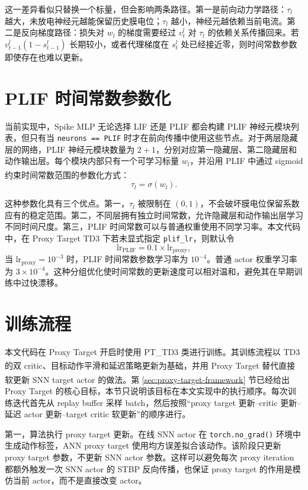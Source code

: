 \documentclass[UTF8,zihao=-4,oneside,openany]{ctexbook}
\let\oldcite\cite
\renewcommand{\cite}[1]{\textsuperscript{\oldcite{#1}}}
\begin{document}
这一差异看似只替换一个标量，但会影响两条路径。第一是前向动力学路径：$\tau_l$ 越大，未放电神经元越能保留历史膜电位；$\tau_l$ 越小，神经元越依赖当前电流。第二是反向梯度路径：损失对 $w_l$ 的梯度需要经过 $v_t^l$ 对 $\tau_l$ 的依赖关系传播回来。若 $v_{t-1}^l(1-s_{t-1}^l)$ 长期较小，或者代理梯度在 $s_t^l$ 处已经接近零，则时间常数参数即使存在也难以更新。

\section{PLIF 时间常数参数化}
当前实现中，Spike MLP 无论选择 LIF 还是 PLIF 都会构建 PLIF 神经元模块列表，但只有当 \texttt{neurons == PLIF} 时才在前向传播中使用这些节点。对于两层隐藏层的网络，PLIF 神经元模块数量为 $2+1$，分别对应第一隐藏层、第二隐藏层和动作输出层。每个模块内部只有一个可学习标量 $w_l$，并沿用 PLIF 中通过 sigmoid 约束时间常数范围的参数化方式\cite{fang2021plif}：
\begin{equation}
\tau_l=\sigma(w_l).
\end{equation}

这种参数化具有三个优点。第一，$\tau_l$ 被限制在 $(0,1)$，不会破坏膜电位保留系数应有的稳定范围。第二，不同层拥有独立时间常数，允许隐藏层和动作输出层学习不同时间尺度。第三，PLIF 时间常数可以与普通权重使用不同学习率。本文代码中，在 Proxy Target TD3 下若未显式指定 \texttt{plif\_lr}，则默认令
\begin{equation}
\mathrm{lr}_{\mathrm{PLIF}}=0.1\times \mathrm{lr}_{\mathrm{proxy}},
\end{equation}
当 $\mathrm{lr}_{\mathrm{proxy}}=10^{-3}$ 时，PLIF 时间常数参数学习率为 $10^{-4}$。普通 actor 权重学习率为 $3\times10^{-4}$。这种分组优化使时间常数的更新速度可以相对温和，避免其在早期训练中过快漂移。

\section{训练流程}
本文代码在 Proxy Target 开启时使用 PT\_TD3 类进行训练。其训练流程以 TD3 的双 critic、目标动作平滑和延迟策略更新为基础\cite{fujimoto2018td3}，并用 Proxy Target 替代直接软更新 SNN target actor 的做法\cite{xu2025proxy}。第 \ref{sec:proxy-target-framework} 节已经给出 Proxy Target 的核心目标，本节只说明该目标在本文实现中的执行顺序。每次训练迭代首先从 replay buffer 采样 batch，然后按照“proxy target 更新--critic 更新--延迟 actor 更新--target critic 软更新”的顺序进行。

第一，算法执行 proxy target 更新。在线 SNN actor 在 \texttt{torch.no\_grad()} 环境中生成动作标签，ANN proxy target 使用均方误差拟合该动作。该阶段只更新 proxy target 参数，不更新 SNN actor 参数。这样可以避免每次 proxy iteration 都额外触发一次 SNN actor 的 STBP 反向传播，也保证 proxy target 的作用是模仿当前 actor，而不是直接改变 actor。
\end{document}

